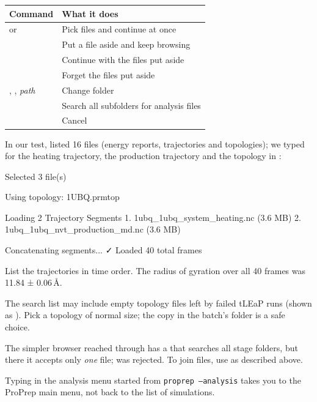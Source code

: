 \begin{tabularx}{\linewidth}{@{}lL@{}}
\toprule
\textbf{Command} & \textbf{What it does} \\
\midrule
{} or  & Pick files and continue at once \\
 & Put a file aside and keep browsing \\
 & Continue with the files put aside \\
 & Forget the files put aside \\
, ,  \textit{path} & Change folder \\
 & Search all subfolders for analysis files \\
 & Cancel \\
\bottomrule
\end{tabularx}

\medskip
In our test,  listed 16 files (energy reports, trajectories and
topologies); we typed  for the heating trajectory, the
production trajectory and the topology in :

\begin{screen}
Selected 3 file(s)

Using topology: 1UBQ.prmtop

Loading 2 Trajectory Segments
  1. 1ubq_1ubq_system_heating.nc (3.6 MB)
  2. 1ubq_1ubq_nvt_production_md.nc (3.6 MB)

Concatenating segments...
✓ Loaded 40 total frames
\end{screen}

List the trajectories in time order. The radius of gyration over all 40
frames was 11.84 ± 0.06\,Å.

\begin{tip}
The search list may include empty topology files left by failed tLEaP runs
(shown as ). Pick a topology of normal size; the copy in the
batch's  folder is a safe choice.
\end{tip}

The simpler browser reached through    has a
 that searches all stage folders, but there it accepts only
\emph{one} file;  was rejected. To join files, use 
as described above.

Typing  in the analysis menu started from \texttt{proprep --analysis}
takes you to the ProPrep main menu, not back to the list of simulations.

